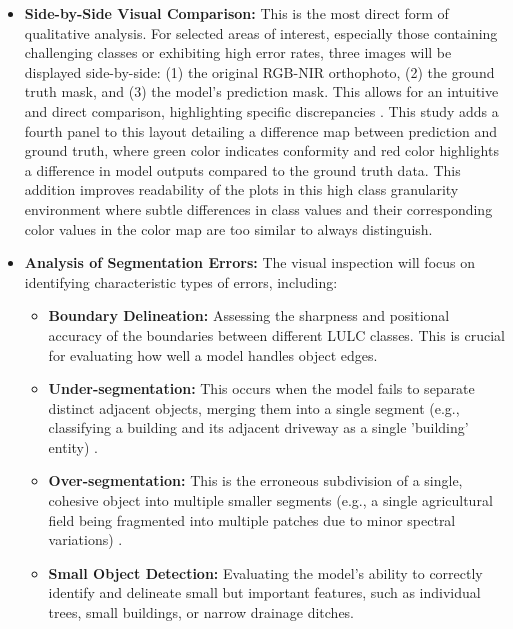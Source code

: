 \documentclass{report}
\begin{document}
\begin{itemize}
\item \textbf{Side-by-Side Visual Comparison:} This is the most direct form of qualitative analysis. For selected areas of interest, especially those containing challenging classes or exhibiting high error rates, three images will be displayed side-by-side: (1) the original RGB-NIR orthophoto, (2) the ground truth mask, and (3) the model's prediction mask. This allows for an intuitive and direct comparison, highlighting specific discrepancies \parencites[p.~316f.;]{KotaridisLazaridouRemotesensingimagesegmentationadvancesmetaanalysis2021a}[p.~12]{SertelEtAlLandUseLandCoverMappingUsingDeepLearningBasedSegmentationApproachesVHRWorldview3Images2022}. This study adds a fourth panel to this layout detailing a difference map between prediction and ground truth, where green color indicates conformity and red color highlights a difference in model outputs compared to the ground truth data. This addition improves readability of the plots in this high class granularity environment where subtle differences in class values and their corresponding color values in the color map are too similar to always distinguish.
\item \textbf{Analysis of Segmentation Errors:} The visual inspection will focus on identifying characteristic types of errors, including:
\begin{itemize}
    \item \textbf{Boundary Delineation:} Assessing the sharpness and positional accuracy of the boundaries between different LULC classes. This is crucial for evaluating how well a model handles object edges.
    \item \textbf{Under-segmentation:} This occurs when the model fails to separate distinct adjacent objects, merging them into a single segment (e.g., classifying a building and its adjacent driveway as a single 'building' entity) \parencite[p.~339]{CostaEtAlSupervisedmethodsimagesegmentationaccuracyassessmentlandcovermapping2018}.
    \item \textbf{Over-segmentation:} This is the erroneous subdivision of a single, cohesive object into multiple smaller segments (e.g., a single agricultural field being fragmented into multiple patches due to minor spectral variations) \parencite[p.~339]{CostaEtAlSupervisedmethodsimagesegmentationaccuracyassessmentlandcovermapping2018}.
    \item \textbf{Small Object Detection:} Evaluating the model's ability to correctly identify and delineate small but important features, such as individual trees, small buildings, or narrow drainage ditches.
\end{itemize}


\end{itemize}
\end{document}
